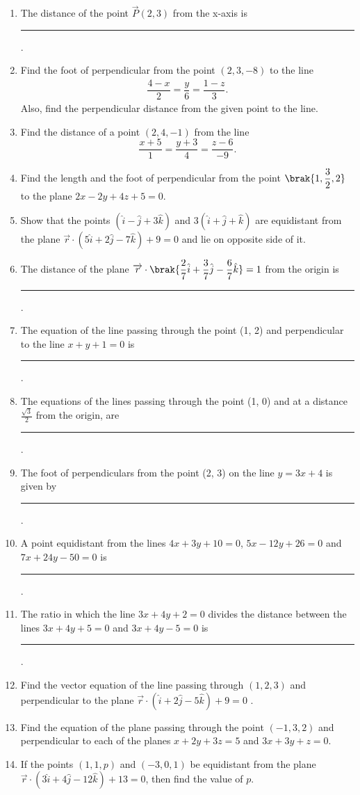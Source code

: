 \begin{enumerate}[label=\thesubsection.\arabic*, ref=\thesubsection.\theenumi]
	\item The distance of the point $\vec{P}(2,  3)$ from the x-axis is
\rule{1cm}{0.1pt}.
\item Find the foot of perpendicular from the point $(2, 3, -8)$ to the line  
\begin{align*}
	\dfrac{4-x}{2}=\dfrac{y}{6}=\dfrac{1-z}{3}.
\end{align*}
	Also,  find the perpendicular distance from the given point to the line.
\item Find the distance of a point $(2, 4, -1)$ from the line $$\frac{x+5}{1}=\frac{y+3}{4}=\frac{z-6}{-9}.$$
\item Find the length and the foot of perpendicular from the point $ \brak{1, \dfrac{3}{2} , 2 }$ to the plane $2x-2y+4z+5=0.$
\item Show that the points $(\hat{i}-\hat{j}+3\hat{k})$ and $3(\hat{i}+\hat{j}+\hat{k})$ are equidistant from the plane $\overrightarrow{r} \cdot (5\hat{i}+2\hat{j}-7\hat{k})+9=0$ and lie on opposite side of it.
\item The distance of the plane $\overrightarrow{r} \cdot \brak{ \dfrac{2}{7}\hat{i}+\dfrac{3}{7}\hat{j}-\dfrac{6}{7}\hat{k}}=1$ from the origin is 
\rule{1cm}{0.1pt}.
\item The equation of the line passing through the point (1, 2) and perpendicular to the line $x+y+1=0$ is
\rule{1cm}{0.1pt}.
\item The equations of the lines passing through the point (1, 0) and at a distance $\frac{\sqrt{3}}{2}$ from the origin,  are 
\rule{1cm}{0.1pt}.
\item The foot of perpendiculars from the point (2, 3) on the line $y=3x+4$ is given by 
\rule{1cm}{0.1pt}.
\item A point equidistant from the lines $4x+3y+10=0$,  $5x-12y+26=0$ and $7x+24y-50=0$ is
\rule{1cm}{0.1pt}.
\item The ratio in which the line $3x+4y+2=0$ divides the distance between the lines $3x+4y+5=0$ and $3x+4y-5=0$ is
\rule{1cm}{0.1pt}.
\item Find the vector equation of the line passing through $(1, 2, 3)$ and perpendicular to the plane $\overrightarrow{r}\cdot(\hat{i}+2\hat{j}-5\hat{k})+9=0$ .
\item Find the equation of the plane passing through the point $(-1, 3, 2)$ and perpendicular to each of the planes $x+2y+3z=5$ and $3x+3y+z=0$.
\item If the points $(1, 1, p)$ and $(-3, 0, 1)$ be equidistant from the plane $\overrightarrow{r}\cdot(3\hat{i}+4\hat{j}-12\hat{k})+13=0$,  then find the value of $p$.

\end{enumerate}
